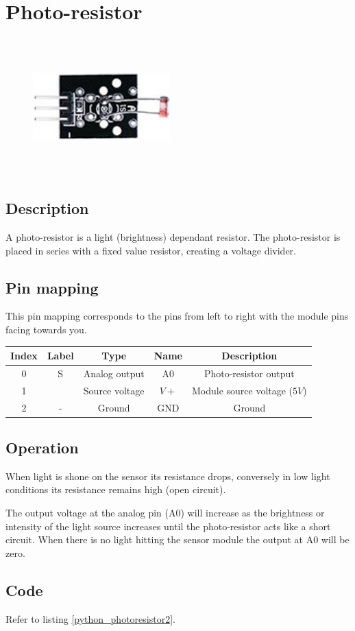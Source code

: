 \section{Photo-resistor}
\begin{figure}[H]
    \centering
    \includegraphics[angle=0, keepaspectratio=true, scale=1, width=200px, height=200px]{images/photosensor.jpg}
\end{figure}
\subsection*{Description}
A photo-resistor is a light (brightness) dependant resistor. The photo-resistor is placed in series with a fixed value resistor, creating a voltage divider.

\subsection*{Pin mapping}
This pin mapping corresponds to the pins from left to right with the module pins facing towards you.
\begin{table}[H]
    \centering
    \begin{tabular}{|c|c|c|c|c|}
    \hline
    Index &Label &Type &Name &Description\\ \hline
    0 &S &Analog output &A0 &Photo-resistor output\\ \hline
    1 & &Source voltage &$V+$ &Module source voltage ($5V$)\\ \hline
    2 &- &Ground &GND &Ground\\ \hline
    \end{tabular}
\end{table}
\subsection*{Operation}
When light is shone on the sensor its resistance drops, conversely in low light conditions its resistance remains high (open circuit).

The output voltage at the analog pin (A0) will increase as the brightness or intensity of the light source increases until the photo-resistor acts like a short circuit. When there is no light hitting the sensor module the output at A0 will be zero.
\subsection*{Code}
Refer to listing \ref{python_photoresistor2}.
%